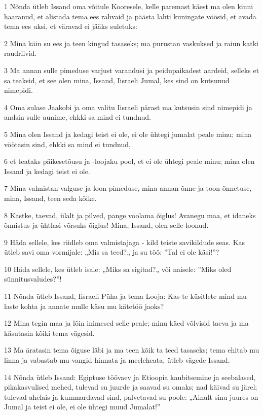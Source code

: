 \par 1 Nõnda ütleb Issand oma võitule Kooresele, kelle paremast käest ma olen kinni haaranud, et alistada tema ees rahvaid ja päästa lahti kuningate vöösid, et avada tema ees uksi, et väravad ei jääks suletuks:
\par 2 Mina käin su ees ja teen kingud tasaseks; ma purustan vaskuksed ja raiun katki raudriivid.
\par 3 Ma annan sulle pimeduse varjust varandusi ja peidupaikadest aardeid, selleks et sa teaksid, et see olen mina, Issand, Iisraeli Jumal, kes sind on kutsunud nimepidi.
\par 4 Oma sulase Jaakobi ja oma valitu Iisraeli pärast ma kutsusin sind nimepidi ja andsin sulle aunime, ehkki sa mind ei tundnud.
\par 5 Mina olen Issand ja kedagi teist ei ole, ei ole ühtegi jumalat peale minu; mina vöötasin sind, ehkki sa mind ei tundnud,
\par 6 et teataks päikesetõusu ja -loojaku pool, et ei ole ühtegi peale minu; mina olen Issand ja kedagi teist ei ole.
\par 7 Mina valmistan valguse ja loon pimeduse, mina annan õnne ja toon õnnetuse, mina, Issand, teen seda kõike.
\par 8 Kastke, taevad, ülalt ja pilved, pange voolama õiglus! Avanegu maa, et idaneks õnnistus ja ühtlasi võrsuks õiglus! Mina, Issand, olen selle loonud.
\par 9 Häda sellele, kes riidleb oma valmistajaga - kild teiste savikildude seas. Kas ütleb savi oma vormijale: „Mis sa teed?„ ja su töö: ”Tal ei ole käsi!”?
\par 10 Häda sellele, kes ütleb isale: „Miks sa sigitad?„ või naisele: ”Miks oled sünnitusvaludes?”!
\par 11 Nõnda ütleb Issand, Iisraeli Püha ja tema Looja: Kas te küsitlete mind mu laste kohta ja annate mulle käsu mu kätetöö jaoks?
\par 12 Mina tegin maa ja lõin inimesed selle peale; minu käed võlvisid taeva ja ma käsutasin kõiki tema vägesid.
\par 13 Ma äratasin tema õiguse läbi ja ma teen kõik ta teed tasaseks; tema ehitab mu linna ja vabastab mu vangid hinnata ja meeleheata, ütleb vägede Issand.
\par 14 Nõnda ütleb Issand: Egiptuse töövaev ja Etioopia kaubitsemine ja seebalased, pikakasvulised mehed, tulevad su juurde ja saavad su omaks; nad käivad su järel; tulevad ahelais ja kummardavad sind, palvetavad su poole: „Ainult sinu juures on Jumal ja teist ei ole, ei ole ühtegi muud Jumalat!”
